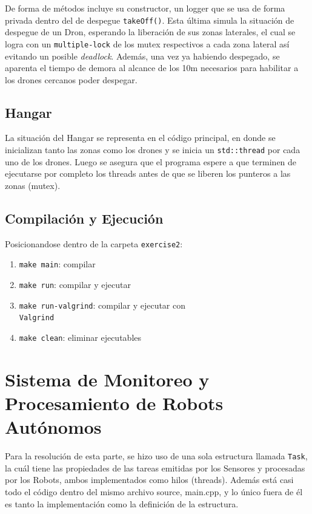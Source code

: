 \documentclass[11pt, a4paper]{article}
\begin{document}
\begin{multicols}{2}
De forma de métodos incluye su constructor, un logger que se usa de forma privada dentro del
de despegue \lstinline|takeOff()|. Esta última simula la situación de despegue de un Dron, esperando
la liberación de sus zonas laterales, el cual se logra con un \lstinline|multiple-lock| de los mutex 
respectivos a cada zona lateral así evitando un posible \textit{deadlock}. Además, una vez ya habiendo
despegado, se aparenta el tiempo de demora al alcance de los 10m necesarios para habilitar a los drones
cercanos poder despegar.

\subsection{Hangar}

La situación del Hangar se representa en el código principal, en donde se inicializan tanto 
las zonas como los drones y se inicia un \lstinline|std::thread| por cada uno de los drones.
Luego se asegura que el programa espere a que terminen de ejecutarse por completo los threads 
antes de que se liberen los punteros a las zonas (mutex).

\subsection{Compilación y Ejecución}

Posicionandose dentro de la carpeta \lstinline|exercise2|:

\begin{enumerate}[label=\roman*.]
    \item \lstinline|make main|: compilar
    \item \lstinline|make run|: compilar y ejecutar
    \item \lstinline|make run-valgrind|: compilar y ejecutar con \\ \lstinline|Valgrind|
    \item \lstinline|make clean|: eliminar ejecutables
\end{enumerate}

\section{Sistema de Monitoreo y Procesamiento de Robots Autónomos}

Para la resolución de esta parte, se hizo uso de una sola estructura
llamada \lstinline|Task|, la cuál tiene las propiedades de las tareas
emitidas por los Sensores y procesadas por los Robots, ambos
implementados como hilos (threads). Además está casi todo el código
dentro del mismo archivo source, main.cpp, y lo único fuera de él es tanto
la implementación como la definición de la estructura.


\end{multicols}
\end{document}
